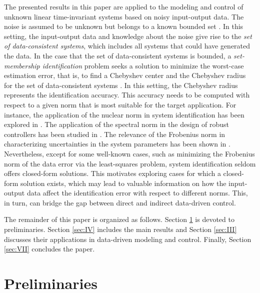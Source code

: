 \documentclass[pdflatex,sn-mathphys-num]{sn-jnl}%
\theoremstyle{thmstyleone}
\begin{document}
The presented results in this paper are applied to the modeling and control of unknown linear time-invariant systems based on noisy input-output data. The noise is assumed to be unknown but belongs to a known bounded set \cite{fogel1979system,belforte1990parameter,fogel1982value,giarre1997model,garulli1999tight,bai1999bounded}. In this setting, the input-output data and knowledge about the noise give rise to the \emph{set of data-consistent systems}, which includes all systems that could have generated the data. In the case that the set of data-consistent systems is bounded, a \emph{set-membership identification} problem seeks a solution to minimize the worst-case estimation error, that is, to find a Chebyshev center and the Chebyshev radius for the set of data-consistent systems \cite{milanese1991optimal,milanese1985optimal,eldar2008minimax,wu2013new}. In this setting, the Chebyshev radius represents the identification accuracy. This accuracy needs to be computed with respect to a given norm that is most suitable for the target application. For instance, the application of the nuclear norm in system identification has been explored in \cite{liu2010interior}. The application of the spectral norm in the design of robust controllers has been studied in \cite{khargonekar1990robust}. The relevance of the Frobenius norm in characterizing uncertainties in the system parameters has been shown in \cite{lee1996quadratic,boukas1999h}. Nevertheless, except for some well-known cases, such as minimizing the Frobenius norm of the data error via the least-squares problem, system identification seldom offers closed-form solutions. This motivates exploring cases for which a closed-form solution exists, which may lead to valuable information on how the input-output data affect the identification error with respect to different norms. This, in turn, can bridge the gap between direct and indirect data-driven control. %

The remainder of this paper is organized as follows. Section \ref{sec:II} is devoted to preliminaries. Section \ref{sec:IV} includes the main results and Section \ref{sec:III} discusses their applications in data-driven modeling and control. Finally, Section \ref{sec:VII} concludes the paper. 

\section{Preliminaries}
\label{sec:II}
\end{document}
